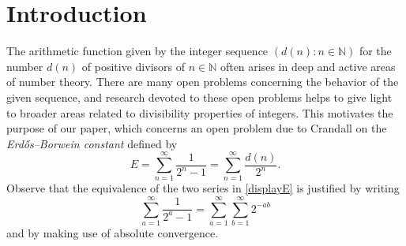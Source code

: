 \documentclass[12pt]{article}
\begin{document}
\section{Introduction}
 The arithmetic function given by the integer sequence $(d(n) : n \in \mathbb{N})$ for the number $d(n)$ of positive divisors of $n \in 
 \mathbb{N}$ often arises in deep and active areas of number theory. There are many open problems concerning the behavior of the given 
 sequence, and research devoted to these open problems helps to give light to broader areas related to divisibility properties of integers. 
 This motivates the purpose of our paper, which concerns an open problem due to Crandall \cite{Crandall2012} 
 on the \emph{Erd\H{o}s--Borwein constant} defined by 
\begin{equation}\label{displayE}
 E = \sum_{n=1}^{\infty} \frac{1}{2^{n} - 1} = \sum_{n=1}^{\infty} \frac{d(n)}{2^n}. 
\end{equation}
 Observe that the equivalence of the two series in \eqref{displayE} is justified by writing $$ \sum_{a=1}^{\infty} \frac{1}{2^{a} - 1} = 
 \sum_{a=1}^{\infty} \sum_{b=1}^{\infty} 2^{-ab} $$
 and by making use of absolute convergence. 
\end{document}
